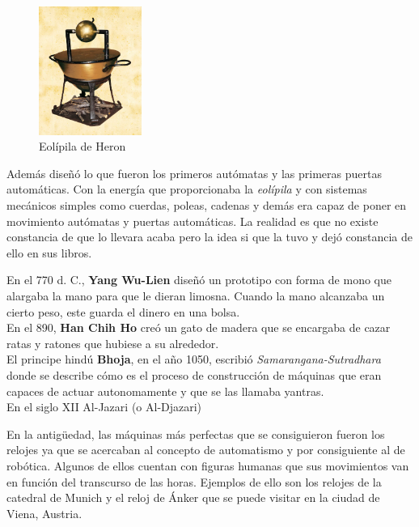 \begin{figure}[H]
\begin{center}
  \includegraphics[width=0.3\textwidth]{./EtapaPrimeriza/imagenes/mv.jpg}
  \caption{Eolípila de Heron}
  \label{mv}
\end{center}
\end{figure}

Además diseñó lo que fueron los primeros autómatas y las primeras puertas automáticas. Con la energía que proporcionaba la \textit{eolípila} y con sistemas mecánicos simples como cuerdas, poleas, cadenas y demás era capaz de poner en movimiento autómatas y puertas automáticas. La realidad es que no existe constancia de que lo llevara acaba pero la idea si que la tuvo y dejó constancia de ello en sus libros.


En el 770 d. C., \textbf{Yang Wu-Lien } diseñó un prototipo con forma de mono que alargaba la mano para que le dieran limosna. Cuando la mano alcanzaba un cierto peso, este guarda el dinero en una bolsa.\\



En el 890, \textbf{Han Chih Ho} creó un gato de madera que se encargaba de cazar ratas y ratones que hubiese a su alrededor.\\

El principe hindú \textbf{Bhoja}, en el año 1050, escribió \textit{Samarangana-Sutradhara} donde se describe cómo es el proceso de construcción de máquinas que eran capaces de actuar autonomamente y que se las llamaba yantras.\\

En el siglo XII Al-Jazari (o Al-Djazari)

En la antigüedad, las máquinas más perfectas que se consiguieron fueron los relojes ya que se acercaban al concepto de automatismo y por consiguiente al de robótica. Algunos de ellos cuentan con figuras humanas que sus movimientos van en función del transcurso de las horas. Ejemplos de ello son los relojes de la catedral de Munich y el reloj de Ánker que se puede visitar en la ciudad de Viena, Austria.

